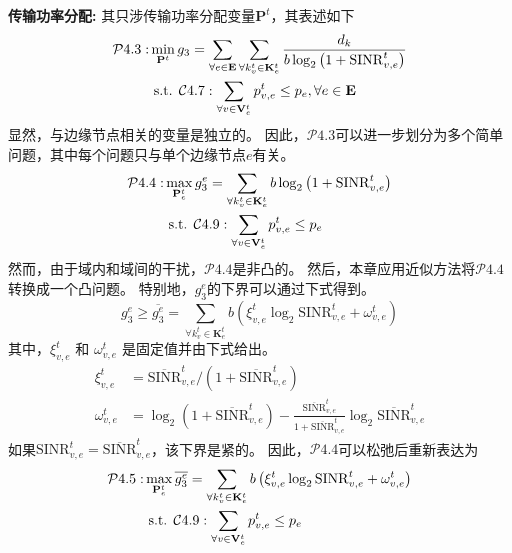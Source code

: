 \textbf{传输功率分配:} 其只涉传输功率分配变量$\mathbf{P}^{t}$，其表述如下
\begin{align}
	\mathcal{P}4.3: &\min_{\mathbf{P}^{t}} g_3= \sum_{ \forall e \in \mathbf{E}} \sum_{\forall k_{v}^{t} \in \mathbf{K}_{e}^{t}}  \frac{d_{k}}{b  \log _{2}\left(1+\mathrm{SINR}_{v, e}^t\right)} \notag \\
	&\text { s.t. } \mathcal{C}4.7: \sum_{\forall v \in \mathbf{V}_{e}^{t}} p_{v, e}^{t} \leq p_{e}, \forall e \in \mathbf{E}
\end{align}
显然，与边缘节点相关的变量是独立的。
因此，$\mathcal{P}4.3$可以进一步划分为多个简单问题，其中每个问题只与单个边缘节点$e$有关。
\begin{align}
	\mathcal{P}4.4: & \max_{\mathbf{P}_{e}^{t}}  g_3^e= \sum_{\forall k_{v}^{t} \in \mathbf{K}_{e}^{t}} {b  \log _{2}\left(1+\mathrm{SINR}_{v, e}^t\right)} \notag \\
	&\text { s.t. } \mathcal{C}4.9: \sum_{\forall v \in \mathbf{V}_{e}^{t}} p_{v, e}^{t} \leq p_{e}  
\end{align}
然而，由于域内和域间的干扰，$\mathcal{P}4.4$是非凸的。
然后，本章应用近似方法将$\mathcal{P}4.4$转换成一个凸问题。
特别地，$g_3^e$的下界可以通过下式得到\cite{papandriopoulos2006low}。
\begin{equation}
	g_3^e \geq \overline{g_3^e} = \sum_{\forall k_{v}^{t} \in \mathbf{K}_{e}^{t}} {b \left( \xi_{v, e}^{t} \log _{2}\mathrm{SINR}_{v, e}^t + \omega_{v, e}^{t} \right) }
\end{equation}
其中，$\xi_{v, e}^{t}$ 和 $\omega_{v, e}^{t}$ 是固定值并由下式给出。
\begin{align}
	\xi_{v, e}^{t} &= \overline{\mathrm{SINR}}_{v, e}^t \bigg/ ( 1 + \overline{\mathrm{SINR}}_{v, e}^t ) \\
	\omega_{v, e}^{t} &= \log _{2} (1+ \overline{\mathrm{SINR}}_{v, e}^t) - \frac{\overline{\mathrm{SINR}}_{v, e}^t}{1 + \overline{\mathrm{SINR}}_{v, e}^t} \log _{2}\overline{\mathrm{SINR}}_{v, e}^t
\end{align}
如果${\mathrm{SINR}}_{v, e}^t =\overline{\mathrm{SINR}}_{v, e}^t$，该下界是紧的。
因此，$\mathcal{P}4.4$可以松弛后重新表达为
\begin{align}
	\mathcal{P}4.5: & \max_{\mathbf{P}_{e}^{t}}  \overline{g_3^e}= \sum_{\forall k_{v}^{t} \in \mathbf{K}_{e}^{t}} {b \left( \xi_{v, e}^{t} \log _{2}\mathrm{SINR}_{v, e}^t + \omega_{v, e}^{t} \right) } \notag \\
	&\text { s.t. } \mathcal{C}4.9: \sum_{\forall v \in \mathbf{V}_{e}^{t}} p_{v, e}^{t} \leq p_{e}  
\end{align}
